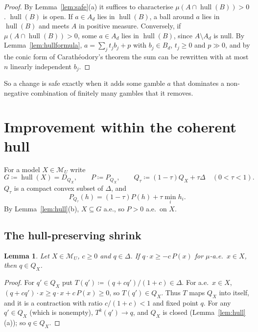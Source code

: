 \documentclass[11pt]{article}
\newcommand{\M}{\mathcal{M}}
\newcommand{\hull}{\operatorname{hull}}
\theoremstyle{plain}
\newtheorem{lemma}[theorem]{Lemma}
\theoremstyle{definition}
\theoremstyle{remark}
\begin{document}
\begin{proof}
By Lemma~\ref{lem:safe}(a) it suffices to characterise $\mu(A\cap\hull(B))>0$.
$\hull(B)$ is open. If $a\in A_d$ lies in $\hull(B)$, a ball around $a$ lies in
$\hull(B)$ and meets $A$ in positive measure. Conversely, if $\mu(A\cap\hull(B))>0$,
some $a\in A_d$ lies in $\hull(B)$, since $A\setminus A_d$ is null. By
Lemma~\ref{lem:hullformula}, $a=\sum_jt_jb_j+p$ with $b_j\in B_d$, $t_j\ge0$
and $p\gg0$, and by the conic form of Carath\'eodory's theorem the sum can be rewritten
with at most $n$ linearly independent $b_j$.
\end{proof}

So a change is safe exactly when it adds some gamble $a$ that dominates a non-negative
combination of finitely many gambles that it removes.

\section{Improvement within the coherent hull}\label{sec:H}

For a model $X\in\M_U$ write
\[
  G\coloneqq\hull(X)=D_{Q_X},\qquad P\coloneqq P_{Q_X},\qquad
  Q_\tau\coloneqq(1-\tau)Q_X+\tau\Delta\quad(0<\tau<1).
\]
$Q_\tau$ is a compact convex subset of $\Delta$, and
\begin{equation}\label{eq:Ptau}
  P_{Q_\tau}(h)=(1-\tau)P(h)+\tau\min_ih_i .
\end{equation}
By Lemma~\ref{lem:hull}(b), $X\subseteq G$ a.e., so $P>0$ a.e.\ on $X$.

\subsection{The hull-preserving shrink}

\begin{lemma}\label{lem:contraction}
Let $X\in\M_U$, $c\ge0$ and $q\in\Delta$. If $q\cdot x\ge-c\,P(x)$ for $\mu$-a.e.\ $x\in
X$, then $q\in Q_X$.
\end{lemma}

\begin{proof}
For $q'\in Q_X$ put $T(q')\coloneqq(q+cq')/(1+c)\in\Delta$. For a.e.\ $x\in X$,
$(q+cq')\cdot x\ge q\cdot x+c\,P(x)\ge0$, so $T(q')\in Q_X$. Thus $T$ maps $Q_X$ into
itself, and it is a contraction with ratio $c/(1+c)<1$ and fixed point $q$. For any
$q'\in Q_X$ (which is nonempty), $T^k(q')\to q$, and $Q_X$ is closed
(Lemma~\ref{lem:hull}(a)); so $q\in Q_X$.
\end{proof}
\end{document}
